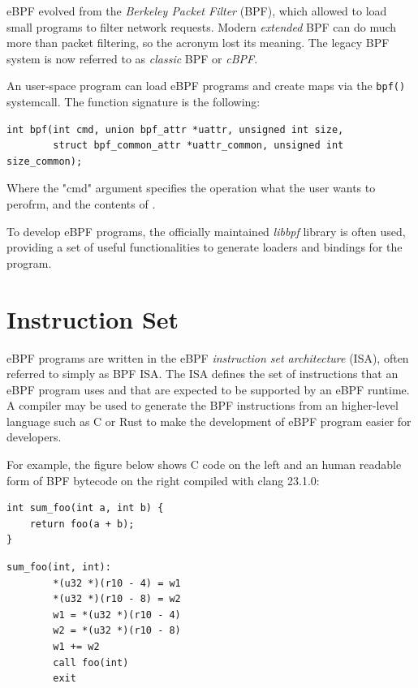 eBPF evolved from the \textit{Berkeley Packet Filter} (BPF), which allowed to
load small programs to filter network requests. Modern \textit{extended} BPF can
do much more than packet filtering, so the acronym lost its meaning. The legacy
BPF system is now referred to as \textit{classic} BPF or \textit{cBPF}.

An user-space program can load eBPF programs and create maps via the
\verb|bpf()| systemcall. The function signature is the following:

\begin{verbatim}
int bpf(int cmd, union bpf_attr *uattr, unsigned int size,
        struct bpf_common_attr *uattr_common, unsigned int size_common);
\end{verbatim}

Where the "cmd" argument specifies the operation what the user wants to perofrm,
and the contents of .

To develop eBPF programs, the officially maintained \textit{libbpf} library is
often used, providing a set of useful functionalities to generate loaders and
bindings for the program.

\section{Instruction Set}

eBPF programs are written in the eBPF \textit{instruction set architecture}
(ISA), often referred to simply as BPF ISA. The ISA defines the set of
instructions that an eBPF program uses and that are expected to be supported by
an eBPF runtime. A compiler may be used to generate the BPF instructions from an
higher-level language such as C or Rust to make the development of eBPF program
easier for developers.

For example, the figure below shows C code on the left and an human readable
form of BPF bytecode on the right compiled with clang 23.1.0:

\noindent
\vspace{0.5em}

\begin{minipage}[t]{0.47\textwidth}
\begin{verbatim}
int sum_foo(int a, int b) {
    return foo(a + b);
}
\end{verbatim}
\end{minipage}%
\hfill
\vrule %
\hfill
\begin{minipage}[t]{0.47\textwidth}
\begin{verbatim}
sum_foo(int, int):
        *(u32 *)(r10 - 4) = w1
        *(u32 *)(r10 - 8) = w2
        w1 = *(u32 *)(r10 - 4)
        w2 = *(u32 *)(r10 - 8)
        w1 += w2
        call foo(int)
        exit
\end{verbatim}
\end{minipage}

